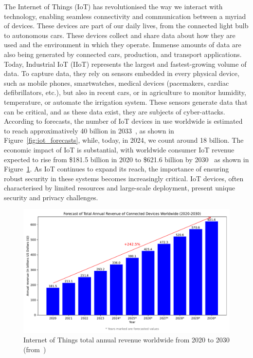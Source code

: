 The Internet of Things (IoT) has revolutionised the way we interact with technology, enabling seamless connectivity and communication between a myriad of devices. These devices are part of our daily lives, from the connected light bulb to autonomous cars. These devices collect and share data about how they are used and the environment in which they operate.  Immense amounts of data are also being generated by connected cars, production, and transport applications. Today, Industrial IoT (IIoT) represents the largest and fastest-growing volume of data.
To capture data, they rely on sensors embedded in every physical device, such as mobile phones, smartwatches, medical devices (pacemakers, cardiac defibrillators, etc.), but also in recent cars, or in agriculture to monitor humidity, temperature, or automate the irrigation system. These sensors generate data that can be critical, and as these data exist, they are subjects of cyber-attacks.
According to forecasts, the number of IoT devices in use worldwide is estimated to reach approximatively 40 billion in 2033~\cite{statista_iot}, as shown in Figure~\ref{fig:iot_forecasts}, while, today, in 2024, we count around 18 billion. The economic impact of IoT is substantial, with worldwide consumer IoT revenue expected to rise from \$181.5 billion in 2020 to \$621.6 billion by 2030~\cite{statista_iot_revenu} as shown in Figure~\ref{fig:iot_revenue}.
As IoT continues to expand its reach, the importance of ensuring robust security in these systems becomes increasingly critical. IoT devices, often characterised by limited resources and large-scale deployment, present unique security and privacy challenges.

\begin{figure}[ht]
    \centering
    \includegraphics[width=\linewidth]{c1_intro/img/iot_revenue.pdf}
    \caption{Internet of Things total annual revenue worldwide from 2020 to 2030 (from~\cite{statista_iot_revenu})}
    \label{fig:iot_revenue}
\end{figure}


